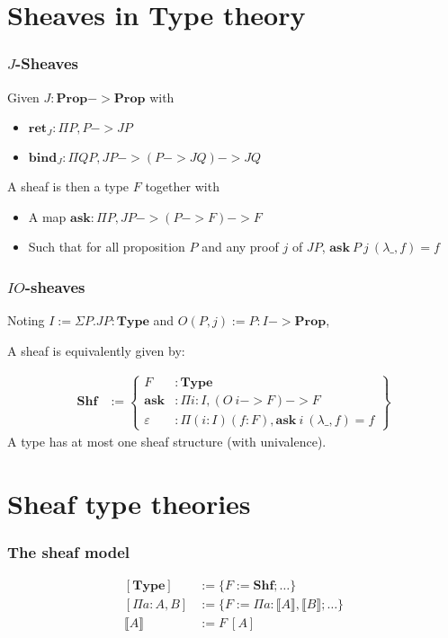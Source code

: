 \documentclass{beamer}
\newcommand{\0}{\boldsymbol{0}}
\newcommand{\1}{\boldsymbol{1}}
\begin{document}
\section{Sheaves in Type theory}

\begin{frame}
    \frametitle{$J$-Sheaves}
    Given $J : \mathbf{Prop}->\mathbf{Prop}$ with
    \begin{itemize}
        \item $\mathbf{ret}_J : \Pi P, P -> JP$
        \item $\mathbf{bind}_J : \Pi Q P, J P -> (P -> JQ)-> JQ$
    \end{itemize}
    \vspace{0.5cm}

    A sheaf is then a type $F$ together with
    \begin{itemize}
        \item A map $\mathbf{ask} : \Pi P, JP -> (P -> F) -> F$
        \item Such that for all proposition $P$ and any proof $j$ of $JP$, $\mathbf{ask}\ P\ j\ (\lambda \_, f) = f$
    \end{itemize}
\end{frame}
\begin{frame}
    \frametitle{$IO$-sheaves}
    Noting $I := \Sigma P. J P : \mathbf{Type}$ and $O (P,j) := P : I -> \mathbf{Prop}$,\vspace{0.5cm}

    A sheaf is equivalently given by:

    $$ \begin{array}{rl}
        \mathbf{Shf} &:=\left\{\begin{array}{rl}
            F& : \mathbf{Type}\\
            \mathbf{ask}&: \Pi i:I, (O\ i -> F) -> F\\
            \varepsilon&:\Pi (i:I)(f:F), \mathbf{ask}\ i\ (\lambda\_, f) = f 
        \end{array}\right\}
    \end{array}$$
    A type has at most one sheaf structure (with univalence).
\end{frame}

\section{Sheaf type theories}

\begin{frame}
   \frametitle{The sheaf model}

   $$ \begin{array}{rl}
        [\mathbf{Type}] &:= \{F:=\mathbf{Shf}; \dots\}\\
        \left[\Pi a : A, B\right] &:= \{F:= \Pi a : \llbracket A\rrbracket, \llbracket B\rrbracket; \dots\}\\
        \llbracket A \rrbracket&:= F\ [A]\\

    \end{array} $$
\end{frame}
\end{document}
